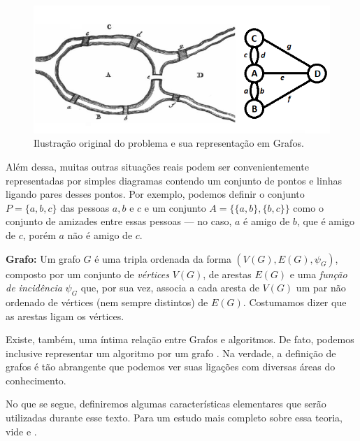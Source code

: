 \documentclass[a4paper,12pt]{article}
\begin{document}
	\begin{figure}[H]
		\begin{center}
			\includegraphics[width=0.85\linewidth]{koenigsbern.png}
		\end{center}
		\caption{Ilustração original do problema \cite{euler:KOENIGSBERG} e sua representação em Grafos.}
		\label{fig:koni}
	\end{figure}
	
	Além dessa, muitas outras situações reais podem ser convenientemente representadas por simples diagramas contendo um conjunto de pontos e linhas ligando pares desses pontos. Por exemplo, podemos definir o conjunto $P = \{a,b,c\}$ das pessoas $a, b$ e $c$ e um conjunto $A = \{\{a,b\}, \{b,c\}\}$ como o conjunto de amizades entre essas pessoas --- no caso, $a$ é amigo de $b$, que é amigo de $c$, porém $a$ não é amigo de $c$. 
		
	\begin{center}
		\begin{minipage}{0.9 \linewidth}
			\textbf{Grafo:} Um grafo $G$ é uma tripla ordenada da forma $(V(G),E(G), \psi_{G})$, composto por um conjunto de \textit{vértices} $V(G)$, de arestas $E(G)$ e uma \textit{função de incidência} $\psi_{G}$ que, por sua vez, associa a cada aresta de $V(G)$ um par não ordenado de vértices (nem sempre distintos) de $E(G)$. Costumamos dizer que as arestas ligam os vértices.
		\end{minipage}
	\end{center}
	
	Existe, também, uma íntima relação entre Grafos e algoritmos. De fato, podemos inclusive representar um algoritmo por um grafo \cite{grafos0}. Na verdade, a definição de grafos é tão abrangente que podemos ver suas ligações com diversas áreas do conhecimento. 
	
	No que se segue, definiremos algumas características elementares que serão utilizadas durante esse texto. Para um estudo mais completo sobre essa teoria, vide \cite{grafos1} e \cite{grafosPremioElon}.
	
\end{document}
